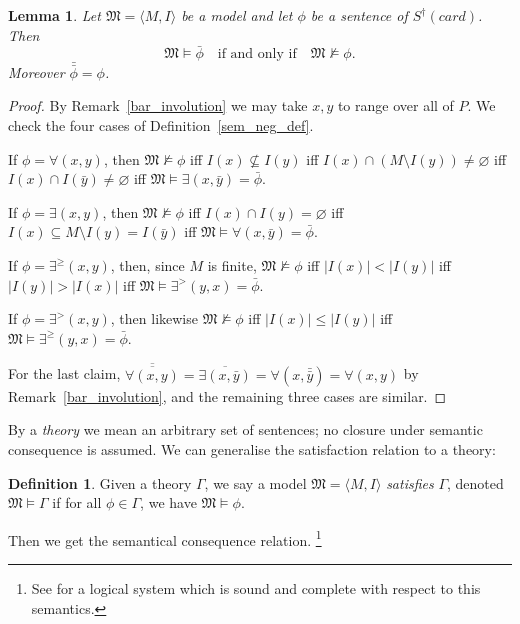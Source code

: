 \documentclass[12pt, reqno]{amsart}
\newtheorem{lemma}[theorem]{Lemma}
\theoremstyle{definition}
\newtheorem{definition}[theorem]{Definition}
\theoremstyle{remark}
\numberwithin{equation}{section}
\begin{document}
\begin{lemma}\label{sem_neg}
Let $\mathfrak{M} = \langle M, I\rangle$ be a model and let $\phi$ be a sentence of
$S^\dagger(card)$. Then
\[
\mathfrak{M} \models \bar{\phi} \quad\text{if and only if}\quad \mathfrak{M} \nvDash \phi.
\]
Moreover $\bar{\bar{\phi}} = \phi$.
\end{lemma}

\begin{proof}
By Remark~\ref{bar_involution} we may take $x, y$ to range over all of $P$. We check the
four cases of Definition~\ref{sem_neg_def}.

If $\phi = \forall(x, y)$, then $\mathfrak{M} \nvDash \phi$ iff
$I(x) \not\subseteq I(y)$ iff $I(x) \cap (M \setminus I(y)) \neq \varnothing$ iff
$I(x) \cap I(\bar{y}) \neq \varnothing$ iff
$\mathfrak{M} \models \exists(x, \bar{y}) = \bar{\phi}$.

If $\phi = \exists(x, y)$, then $\mathfrak{M} \nvDash \phi$ iff
$I(x) \cap I(y) = \varnothing$ iff $I(x) \subseteq M \setminus I(y) = I(\bar{y})$ iff
$\mathfrak{M} \models \forall(x, \bar{y}) = \bar{\phi}$.

If $\phi = \exists^{\geq}(x, y)$, then, since $M$ is finite, $\mathfrak{M} \nvDash \phi$
iff $|I(x)| < |I(y)|$ iff $|I(y)| > |I(x)|$ iff
$\mathfrak{M} \models \exists^{>}(y, x) = \bar{\phi}$.

If $\phi = \exists^{>}(x, y)$, then likewise $\mathfrak{M} \nvDash \phi$ iff
$|I(x)| \leq |I(y)|$ iff $\mathfrak{M} \models \exists^{\geq}(y, x) = \bar{\phi}$.

For the last claim, $\overline{\overline{\forall(x,y)}} = \overline{\exists(x,\bar{y})}
= \forall(x, \bar{\bar{y}}) = \forall(x, y)$ by Remark~\ref{bar_involution}, and the
remaining three cases are similar.
\end{proof}


By a \emph{theory} we mean an arbitrary set of sentences; no closure
under semantic consequence is assumed. We can generalise the satisfaction relation to a theory: 

\begin{definition}
Given a theory $\Gamma$, we say a model $\mathfrak{M} = \langle M, I\rangle$ \textit{satisfies} $\Gamma$, denoted $\mathfrak{M}  \models \Gamma$ if for all $\phi \in \Gamma$, we have $\mathfrak{M}  \models \phi$. 
\end{definition}

Then we get the semantical consequence relation. \footnote{See \cite{Larry} for a logical system which is sound and complete with respect to this semantics.}
\end{document}
